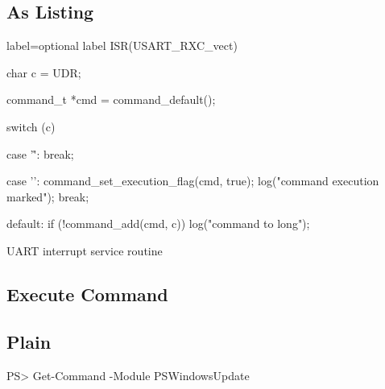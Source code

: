 \documentclass[10pt,a4paper,parskip=half]{scrartcl}
\theoremstyle{plain}
\newcommand{\exec}[1]{}
\begin{document}
\subsection{As Listing}
\label{sub:as_listing}

\begin{listing}[h!]
    \begin{ccode*}{label={optional label}}
ISR(USART_RXC_vect) {
    char c = UDR;

    command_t *cmd = command_default();

    switch (c) {
        case '\r':
            break;

        case '\n':
            command_set_execution_flag(cmd, true);
            log("command execution marked");
            break;

        default:
            if (!command_add(cmd, c)) {
                log("command to long");
            }
    }
}
    \end{ccode*}
    \caption{UART interrupt service routine}
    \label{lst:uart_isr}
\end{listing}

\subsection{Execute Command}
\label{sub:execute_command}

\exec{"uname -a"}

\subsection{Plain}
\label{sub:plain}

\begin{plaincode}
    PS> Get-Command -Module PSWindowsUpdate
\end{plaincode}
\end{document}

